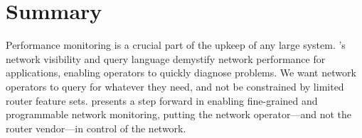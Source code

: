 \section{Summary}
\label{sec:conclusion}

Performance monitoring is a crucial part of the upkeep of any large system.
\TheSystem's network visibility and query language demystify network
performance for applications, enabling operators to quickly diagnose
problems.  We want network operators to query for whatever they need, and not
be constrained by limited router feature sets. \TheSystem presents a step
forward in enabling fine-grained and programmable network monitoring, putting
the network operator---and not the router vendor---in control of the network.
